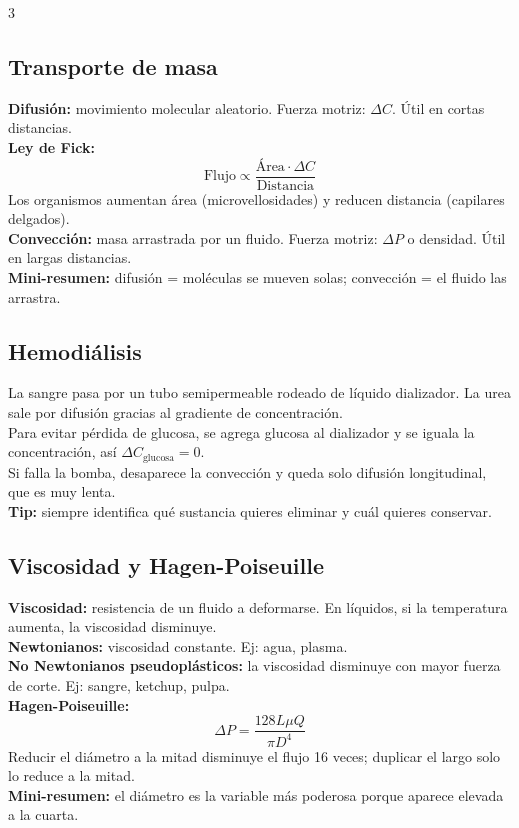 \documentclass[9pt,landscape,letterpaper]{extarticle}
\begin{document}
\begin{multicols*}{3}
	\subsection{Transporte de masa}
	\textbf{Difusión:} movimiento molecular aleatorio. Fuerza motriz: $\Delta C$. Útil en cortas distancias.\\
	\textbf{Ley de Fick:}
	\[
		\text{Flujo}\propto \frac{\text{Área}\cdot \Delta C}{\text{Distancia}}
	\]
	Los organismos aumentan área (microvellosidades) y reducen distancia (capilares delgados).\\
	\textbf{Convección:} masa arrastrada por un fluido. Fuerza motriz: $\Delta P$ o densidad. Útil en largas distancias.\\
	\textbf{Mini-resumen:} difusión = moléculas se mueven solas; convección = el fluido las arrastra.

	\subsection{Hemodiálisis}
	La sangre pasa por un tubo semipermeable rodeado de líquido dializador. La urea sale por difusión gracias al gradiente de concentración.\\
	Para evitar pérdida de glucosa, se agrega glucosa al dializador y se iguala la concentración, así $\Delta C_{\text{glucosa}}=0$.\\
	Si falla la bomba, desaparece la convección y queda solo difusión longitudinal, que es muy lenta.\\
	\textbf{Tip:} siempre identifica qué sustancia quieres eliminar y cuál quieres conservar.

	\subsection{Viscosidad y Hagen-Poiseuille}
	\textbf{Viscosidad:} resistencia de un fluido a deformarse. En líquidos, si la temperatura aumenta, la viscosidad disminuye.\\
	\textbf{Newtonianos:} viscosidad constante. Ej: agua, plasma.\\
	\textbf{No Newtonianos pseudoplásticos:} la viscosidad disminuye con mayor fuerza de corte. Ej: sangre, ketchup, pulpa.\\
	\textbf{Hagen-Poiseuille:}
	\[
		\Delta P=\frac{128L\mu Q}{\pi D^4}
	\]
	Reducir el diámetro a la mitad disminuye el flujo 16 veces; duplicar el largo solo lo reduce a la mitad.\\
	\textbf{Mini-resumen:} el diámetro es la variable más poderosa porque aparece elevada a la cuarta.


\end{multicols*}
\end{document}
